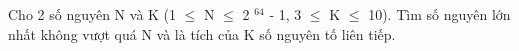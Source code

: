 Cho 2 số nguyên N và K (1  $\le$  N  $\le$  2   $^    64   $   - 1, 3  $\le$  K  $\le$  10). Tìm số nguyên lớn nhất không vượt quá N và là tích của K số nguyên tố liên tiếp.  

\